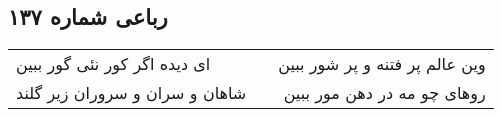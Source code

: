\begin{center}
\section*{رباعی شماره ۱۳۷}
\label{sec:sh137}
\begin{longtable}{l p{0.5cm} r}
ای دیده اگر کور نئی گور ببین
&&
وین عالم پر فتنه و پر شور ببین
\\
شاهان و سران و سروران زیر گلند
&&
روهای چو مه در دهن مور ببین
\\
\end{longtable}
\end{center}
